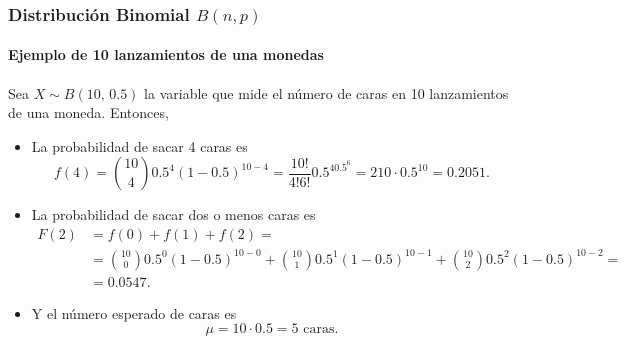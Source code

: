 \begin{frame}
\frametitle{Distribución Binomial $B(n,p)$}
\framesubtitle{Ejemplo de 10 lanzamientos de una monedas}
Sea $X\sim B(10,\,0.5)$ la variable que mide el número de caras en 10 lanzamientos de una moneda. Entonces,
\begin{itemize}
\item La probabilidad de sacar 4 caras es
\[
f(4) = \binom{10}{4}0.5^4 (1-0.5)^{10-4} = \frac{10!}{4!6!}0.5^40.5^6 = 210\cdot 0.5^{10} = 0.2051.
\]
\item La probabilidad de sacar dos o menos caras es
\begin{align*}
F(2) &= f(0) +f(1) + f(2) =\\
&= \binom{10}{0}0.5^0 (1-0.5)^{10-0} + \binom{10}{1}0.5^1 (1-0.5)^{10-1} + \binom{10}{2}0.5^2 (1-0.5)^{10-2} =\\
&= 0.0547.
\end{align*}
\item Y el número esperado de caras es 
\[ \mu = 10\cdot 0.5 = 5 \mbox{ caras}.\]   
\end{itemize}

\end{frame}


